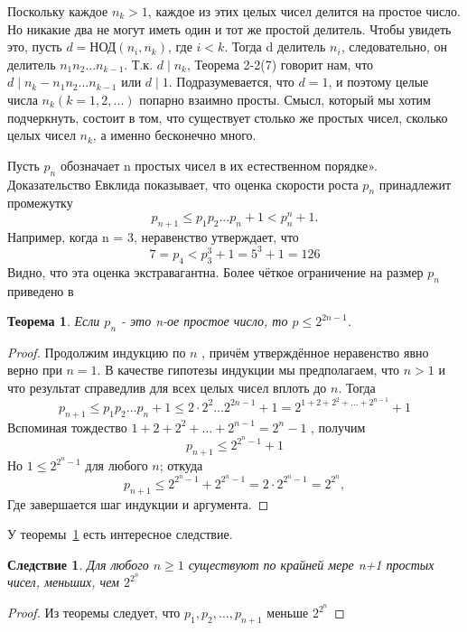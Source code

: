 \documentclass[11pt]{article}
\newtheorem{theorem}{Теорема}
\newtheorem{corollary}{Следствие}
\begin{document}
Поскольку каждое $n_{k}> 1$, каждое из этих целых чисел делится на простое число. Но никакие два не могут иметь один и тот же простой делитель. Чтобы увидеть это, пусть $d = \text{НОД} (n_{i},n_{k})$, где $i<k$. Тогда d делитель $n_{i}$, следовательно, он делитель $n_{1}n_{2}...n_{k-1}$. Т.к. $d\mid n_{k}$, Теорема 2-2(7) говорит нам, что $d\mid n_{k}-n_{1}n_{2}...n_{k-1}$ или $d \mid 1$. Подразумевается, что $d = 1$, и поэтому целые числа $n_{k}(k = 1,2,...)$ попарно взаимно просты. Смысл, который мы хотим подчеркнуть, состоит в том, что существует столько же простых чисел, сколько целых чисел $n_{k}$, а именно бесконечно много.

Пусть $p_{n}$ обозначает n простых чисел в их естественном порядке». Доказательство Евклида показывает, что оценка скорости роста $p_{n}$ принадлежит промежутку \[p_{n+1} \leq p_{1}p_{2}...p_{n}+1 < p_{n}^{n}+1 .\] Например, когда n = 3, неравенство утверждает, что \[7 = p_{4} < p_{3}^{3} + 1 = 5^{3} + 1 = 126\] Видно, что эта оценка экстравагантна. Более чёткое ограничение на размер $p_{n}$ приведено в
\thispagestyle{fancy}
\lhead{\thepage}
\begin{theorem}
	\label{th3-5}
	Если $p_{n}$ - это n-ое простое число, то $p \leq 2^{2n-1}$.
\end{theorem}
\begin{proof}
Продолжим индукцию по $n$ , причём утверждённое неравенство явно верно при $n = 1$. В качестве гипотезы индукции мы предполагаем, что $n > 1$ и что результат справедлив для всех целых чисел вплоть до $n$. Тогда \[p_{n+1} \leq p_{1}p_{2}...p_{n}+1 \leq 2 \cdot 2^{2} ...2^{2n-1} + 1 = 2^{1+2+2^{2}+...+2^{n-1}}+1 \]
Вспоминая тождество $1 + 2 + 2^{2}+ … + 2^{n-1} = 2^{n}  - 1$ , получим \[p_{n+1} \leq 2^{2^{n}-1}+1\]
Но $1 \leq 2^{2^{n}-1}$ для любого $n$; откуда \[p_{n+1} \leq 2^{2^n-1} + 2^{2^n-1} = 2 \cdot 2^{2^{n}-1} = 2^{2^{n}},\] Где завершается шаг индукции и аргумента.
\end{proof}
	У теоремы~\ref{th3-5} есть интересное следствие. 
	\begin{corollary}
		Для любого $n \geq 1$ существуют по крайней мере n+1 простых чисел, меньших, чем $2^{2^{n}}$
	\end{corollary}
\begin{proof}
	Из теоремы следует, что $p_1,p_2,...,p_{n+1}$ меньше $2^{2^{n}}$
\end{proof}
\end{document}

